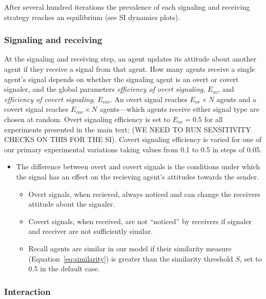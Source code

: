\documentclass[11pt,letterpaper]{article}
\begin{document}
After several hundred iterations the prevalence of each signaling and
receiving strategy reaches an equilibrium (see SI dynamics plots). 


\subsubsection{Signaling and receiving}

At the signaling and receiving step, an agent updates its attitude about another
agent if they receive a signal from that agent. How many agents receive a
single agent's signal depends on whether the signaling agent is an overt or
covert signaler, and the global parameters \emph{efficiency of overt signaling}, $E_{ov}$,
and \emph{efficiency of covert signaling}, $E_{cov}$. An overt signal reaches
$E_{ov} \times N$ agents and a covert signal reaches $E_{cov} \times N$ 
agents---which agents receive either signal type are chosen at random.
Overt signaling efficiency is set to $E_{ov}=0.5$ for all experiments presented
in the main text; (WE NEED TO RUN SENSITIVITY CHECKS ON THIS FOR THE SI). Covert
signaling efficiency is varied for one of our primary experimental variations
taking values from 0.1 to 0.5 in steps of 0.05. 

\begin{itemize}
  \item The difference between overt and covert signals is the conditions
    under which the signal has an effect on the recieving agent's attitudes
    towards the sender.
    \begin{itemize}
      \item Overt signals, when recieved, always noticed and can change the
        receivers attitude about the signaler.
      \item Covert signals, when received, are not ``noticed'' by receivers
        if signaler and receiver are not sufficiently similar. 
      \item Recall agents are similar in our model if their similarity measure
          (Equation~\ref{eq:similarity}) is greater than the similarity
          threshold $S$, set to 0.5 in the default case.
    \end{itemize}
\end{itemize}

\subsubsection{Interaction}
\end{document}
